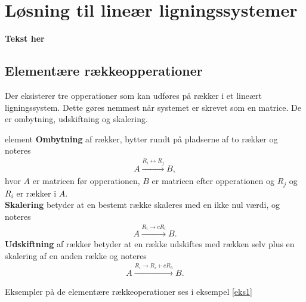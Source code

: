 \section{Løsning til lineær ligningssystemer}
%
\textbf{Tekst her}
%
\subsection{Elementære rækkeopperationer}
Der eksisterer tre opperationer som kan udføres på rækker i et lineært ligningssystem.
Dette gøres nemmest når systemet er skrevet som en matrice.
De er ombytning, udskiftning og skalering.

\begin{defn}{}{element}
\textbf{Ombytning} af rækker, bytter rundt på pladserne af to rækker og noteres
\begin{align*}
A \xrightarrow{R_i \leftrightarrow R_j} B, 
\end{align*}
hvor $A$ er matricen før opperationen, $B$ er matricen efter opperationen og $R_j$ og $R_i$ er rækker i $A$.\\
\textbf{Skalering} betyder at en bestemt række skaleres med en ikke nul værdi, og noteres
\begin{align*}
A \xrightarrow{R_i \rightarrow cR_i} B.
\end{align*}
\textbf{Udskiftning} af rækker betyder at en række udskiftes med rækken selv plus en skalering af en anden række og noteres
\begin{align*}
A \xrightarrow{R_i \rightarrow R_i + cR_h} B.
\end{align*}

\end{defn}
\noindent
Eksempler på de elementære rækkeoperationer ses i eksempel \ref{eks1}

